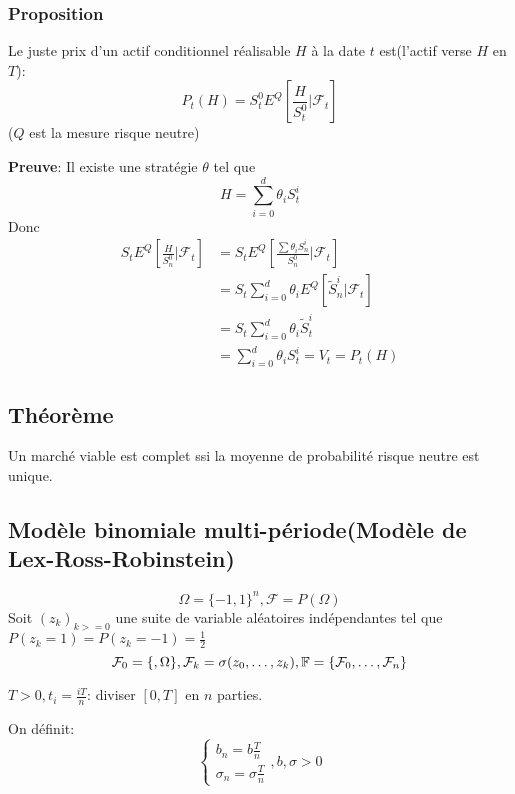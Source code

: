 \documentclass{article}
\begin{document}
\subsubsection{Proposition}
Le juste prix d'un actif conditionnel r\'ealisable $H$ \`a la date $t$ est(l'actif verse $H$ en $T$):
\begin{equation}
P_t(H)=S_t^0 E^Q[\frac{H}{S^0_t}|\mathcal{F}_t]
\end{equation}
($Q$ est la mesure risque neutre)

\textbf{Preuve}:
Il existe une strat\'egie $\theta$ tel que 
\begin{equation}
H=\sum_{i=0}^d \theta_i S_t^i
\end{equation}
Donc
\begin{equation}
\begin{split}
S_tE^Q[\frac{H}{S_n^0}|\mathcal{F}_t]&=S_tE^Q[\frac{\sum\theta_i S_n^i}{S_n^0}|\mathcal{F}_t]\\
&=S_t\sum_{i=0}^d\theta_i E^Q[\tilde{S}_n^i|\mathcal{F}_t]\\
&=S_t\sum_{i=0}^d\theta_i\tilde{S}_t^i\\
&=\sum_{i=0}^d\theta_i S_t^i=V_t=P_t(H)
\end{split}
\end{equation}

\subsection{Th\'eor\`eme}
Un march\'e viable est complet ssi la moyenne de probabilit\'e risque neutre est unique.

\subsection{Mod\`ele binomiale multi-p\'eriode(Mod\`ele de Lex-Ross-Robinstein)}
\begin{equation}
\Omega=\{-1,1\}^n,\mathcal{F}=P(\Omega)
\end{equation}
Soit $(z_k)_{k>=0}$ une suite de variable al\'eatoires ind\'ependantes tel que $P(z_k=1)=P(z_k=-1)=\frac{1}{2}$
\begin{equation}
\mathcal{F}_0=\{\empty,\Omega\},\mathcal{F}_k=\sigma(z_0,\ldots,z_k),\mathbb{F}=\{\mathcal{F}_0,\ldots,\mathcal{F}_n\}
\end{equation}

$T>0, t_i=\frac{iT}{n}$: diviser $[0,T]$ en $n$ parties.

On d\'efinit:
\begin{equation}
\left\{\begin{array}{rcl}
b_n=b\frac{T}{n}\\
\sigma_n=\sigma\frac{T}{n}
\end{array}\right.
,b,\sigma>0
\end{equation}
\end{document}
